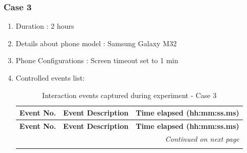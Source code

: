 \documentclass{article}
\begin{document}
\subsubsection{Case 3}
\begin{enumerate}
    \item Duration : 2 hours
    \item Details about phone model : Samsung Galaxy M32
    \item Phone Configurations : Screen timeout set to 1 min
    \item Controlled events list:
    
    \begin{longtable}{c p{8cm} p{3cm}}
        \caption{Interaction events captured during experiment - Case 3}
        \label{tab:Interaction_events_captured_during_experiment_Case_3} \\

        \toprule
        \textbf{Event No.} & \textbf{Event Description} & \textbf{Time elapsed (hh:mm:ss.ms)} \\
        \midrule
        \endfirsthead

        \toprule
        \textbf{Event No.} & \textbf{Event Description} & \textbf{Time elapsed (hh:mm:ss.ms)} \\
        \midrule
        \endhead

        \midrule
        \multicolumn{3}{r}{\textit{Continued on next page}}
        \\
        \endfoot

        \bottomrule
        \endlastfoot


\end{longtable}
\end{enumerate}
\end{document}
